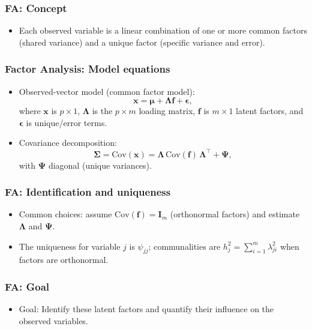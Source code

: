 \documentclass{beamer}
\begin{document}
\begin{frame}
    \frametitle{FA: Concept}
    \begin{itemize}
        \item Each observed variable is a linear combination of one or more common factors (shared variance) and a unique factor (specific variance and error).
    \end{itemize}
\end{frame}

\begin{frame}
    \frametitle{Factor Analysis: Model equations}
    \begin{itemize}
        \item Observed-vector model (common factor model):
        \[\mathbf{x}=\boldsymbol{\mu}+\mathbf{\Lambda}\mathbf{f}+\boldsymbol{\epsilon},\]
        where $\mathbf{x}$ is $p\times 1$, $\mathbf{\Lambda}$ is the $p\times m$ loading matrix, $\mathbf{f}$ is $m\times1$ latent factors, and $\boldsymbol{\epsilon}$ is unique/error terms.
        \item Covariance decomposition:
        \[\boldsymbol{\Sigma}=\mathrm{Cov}(\mathbf{x})=\mathbf{\Lambda}\,\mathrm{Cov}(\mathbf{f})\,\mathbf{\Lambda}^\top+\boldsymbol{\Psi},\]
        with $\boldsymbol{\Psi}$ diagonal (unique variances).
    \end{itemize}
\end{frame}

\begin{frame}
    \frametitle{FA: Identification and uniqueness}
    \begin{itemize}
        \item Common choices: assume $\mathrm{Cov}(\mathbf{f})=\mathbf{I}_m$ (orthonormal factors) and estimate $\mathbf{\Lambda}$ and $\boldsymbol{\Psi}$.
        \item The uniqueness for variable $j$ is $\psi_{jj}$; communalities are $h_j^2=\sum_{i=1}^m\lambda_{ji}^2$ when factors are orthonormal.
    \end{itemize}
\end{frame}

\begin{frame}
    \frametitle{FA: Goal}
    \begin{itemize}
        \item Goal: Identify these latent factors and quantify their influence on the observed variables.
    \end{itemize}
\end{frame}
\end{document}
